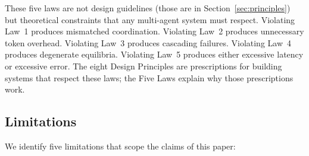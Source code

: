 \documentclass{article}
\begin{document}
\noindent
These five laws are not design guidelines (those are in Section~\ref{sec:principles})
but theoretical constraints that any multi-agent system must respect. Violating Law~1
produces mismatched coordination. Violating Law~2 produces unnecessary token overhead.
Violating Law~3 produces cascading failures. Violating Law~4 produces degenerate
equilibria. Violating Law~5 produces either excessive latency or excessive error. The
eight Design Principles are prescriptions for building systems that respect these laws;
the Five Laws explain why those prescriptions work.

\subsection{Limitations}
\label{sec:disc-limits}

%
%
%
%

We identify five limitations that scope the claims of this paper:
\end{document}
